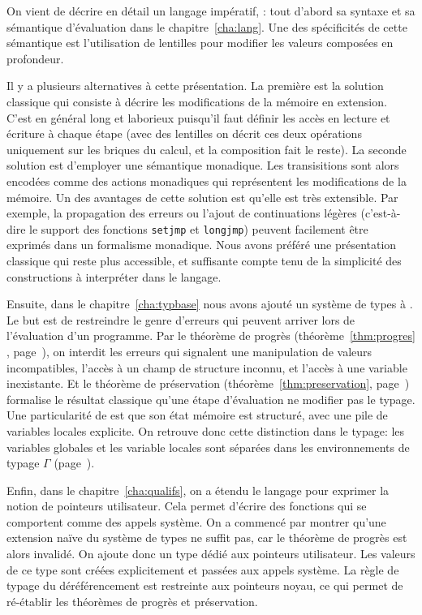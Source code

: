 On vient de décrire en détail un langage impératif, \langname: tout d'abord sa
syntaxe et sa sémantique d'évaluation dans le chapitre~\ref{cha:lang}. Une des
spécificités de cette sémantique est l'utilisation de lentilles pour modifier
les valeurs composées en profondeur.

\label{page:ccl-II-monad}
Il y a plusieurs alternatives à cette présentation. La première est la solution
classique qui consiste à décrire les modifications de la mémoire en extension.
C'est en général long et laborieux puisqu'il faut définir les accès en lecture
et écriture à chaque étape (avec des lentilles on décrit ces deux opérations
uniquement sur les briques du calcul, et la composition fait le reste). La
seconde solution est d'employer une sémantique monadique. Les transisitions sont
alors encodées comme des actions monadiques qui représentent les modifications
de la mémoire. Un des avantages de cette solution est qu'elle est très
extensible. Par exemple, la propagation des erreurs ou l'ajout de continuations
légères (c'est-à-dire le support des fonctions \texttt{setjmp} et
\texttt{longjmp}) peuvent facilement être exprimés dans un formalisme monadique.
Nous avons préféré une présentation classique qui reste plus accessible, et
suffisante compte tenu de la simplicité des constructions à interpréter dans le
langage.


Ensuite, dans le chapitre~\ref{cha:typbase} nous avons ajouté un système de
types à \langname. Le but est de restreindre le genre d'erreurs qui peuvent
arriver lors de l'évaluation d'un programme. Par le théorème de progrès
(théorème~\ref{thm:progres} , page~\pageref{thm:progres}), on interdit les
erreurs qui signalent une manipulation de valeurs incompatibles, l'accès à un
champ de structure inconnu, et l'accès à une variable inexistante. Et le
théorème de préservation (théorème~\ref{thm:preservation},
page~\pageref{thm:preservation}) formalise le résultat classique qu'une étape
d'évaluation ne modifier pas le typage.
Une particularité de \langname est que son état mémoire est structuré, avec une
pile de variables locales explicite. On retrouve donc cette distinction dans le
typage: les variables globales et les variable locales sont séparées dans les
environnements de typage $Γ$ (page~\pageref{page:gamma-split}).

Enfin, dans le chapitre~\ref{cha:qualifs}, on a étendu le langage pour exprimer
la notion de pointeurs utilisateur. Cela permet d'écrire des fonctions qui se
comportent comme des appels système. On a commencé par montrer qu'une extension
naïve du système de types ne suffit pas, car le théorème de progrès est alors
invalidé. On ajoute donc un type dédié aux pointeurs utilisateur. Les valeurs de
ce type sont créées explicitement et passées aux appels système. La règle de
typage du déréférencement est restreinte aux pointeurs noyau, ce qui permet de
ré-établir les théorèmes de progrès et préservation.


